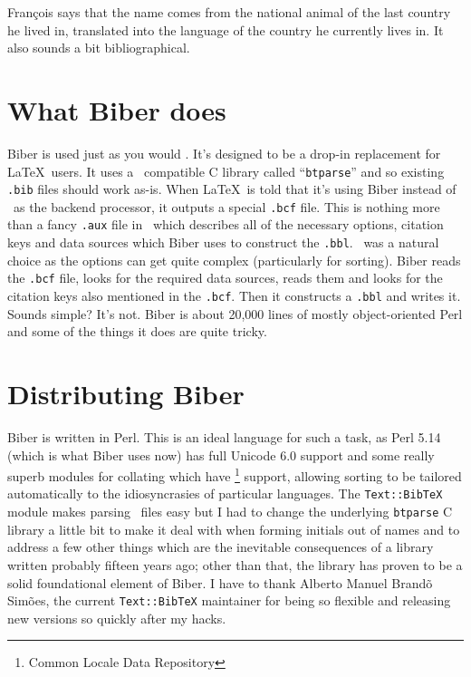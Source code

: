 \documentclass[final]{ltugboat}
\def\BibLaTeX{\Bib\LaTeX}
\begin{document}
Fran\c{c}ois says that the name comes from the national animal of the
last country he lived in, translated into the language of the country
he currently lives in. It also sounds a bit bibliographical.

\section{What Biber does}

Biber is used just as you would \BibTeX. It's designed to be a drop-in
replacement for \BibLaTeX\ users. It uses a \BibTeX\ compatible C
library called ``\verb|btparse|'' and so existing \verb|.bib| files should
work as-is. When \BibLaTeX\ is told that it's using Biber instead of
\BibTeX\ as the backend processor, it outputs a special \verb|.bcf| file.
This is nothing more than a fancy \verb|.aux| file in \XML\ which describes
all of the necessary options, citation keys and data sources which Biber
uses to construct the \verb|.bbl|. \XML\ was a natural choice as the options
can get quite complex (particularly for sorting). Biber reads the
\verb|.bcf| file, looks for the required data sources, reads them
and looks for the citation keys also mentioned in the \verb|.bcf|. Then it
constructs a \verb|.bbl| and writes it. Sounds simple? It's not. Biber is about
20,000 lines of mostly object-oriented Perl and some of the things it does
are quite tricky.

\section{Distributing Biber}

Biber is written in Perl. This is an ideal language for such a task, as
Perl 5.14 (which is what Biber uses now) has full Unicode 6.0 support
and some really superb modules for collating  which have
\footnote{Common Locale Data Repository} support, allowing
sorting to be tailored automatically to the idiosyncrasies of
particular languages. The \verb|Text::BibTeX| module makes
parsing \BibTeX\ files easy but I had to change the underlying \verb|btparse| C
library a little bit to make it deal with  when forming
initials out of names and to address a few other things which are the
inevitable consequences of a library written probably fifteen years
ago; other than that, the library has proven to be a solid foundational
element of Biber. I have to thank Alberto Manuel Brand\~{o}
Sim\~{o}es, the current \verb|Text::BibTeX| maintainer for being so
flexible and releasing new versions so quickly after my hacks.
\end{document}

